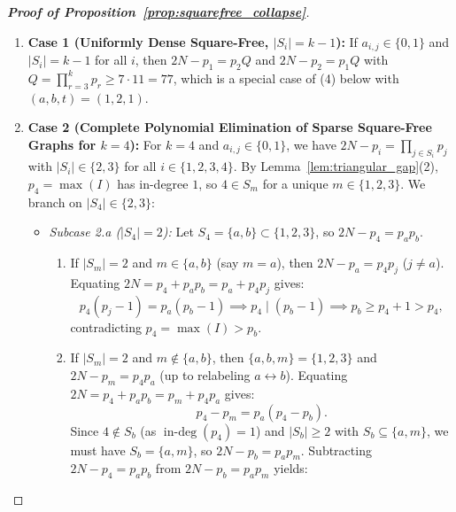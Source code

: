 \documentclass[11pt,a4paper]{article}
\theoremstyle{definition}
\begin{document}
\begin{proof}[\textbf{Proof of Proposition~\ref{prop:squarefree_collapse}}]
\begin{enumerate}
    \item \textbf{Case 1 (Uniformly Dense Square-Free, $|S_i| = k - 1$):}  
    If $a_{i,j} \in \{0, 1\}$ and $|S_i| = k - 1$ for all $i$, then $2N - p_1 = p_2 Q$ and $2N - p_2 = p_1 Q$ with $Q = \prod_{r=3}^k p_r \ge 7 \cdot 11 = 77$, which is a special case of (4) below with $(a, b, t) = (1, 2, 1)$.

    \item \textbf{Case 2 (Complete Polynomial Elimination of Sparse Square-Free Graphs for $k = 4$):}  
    For $k = 4$ and $a_{i,j} \in \{0, 1\}$, we have $2N - p_i = \prod_{j \in S_i} p_j$ with $|S_i| \in \{2, 3\}$ for all $i \in \{1, 2, 3, 4\}$. By Lemma~\ref{lem:triangular_gap}(2), $p_4 = \max(I)$ has in-degree $1$, so $4 \in S_m$ for a unique $m \in \{1, 2, 3\}$. We branch on $|S_4| \in \{2, 3\}$:
    \begin{itemize}
        \item \emph{Subcase 2.a ($|S_4| = 2$):} Let $S_4 = \{a, b\} \subset \{1, 2, 3\}$, so $2N - p_4 = p_a p_b$.
        \begin{enumerate}
            \item If $|S_m| = 2$ and $m \in \{a, b\}$ (say $m = a$), then $2N - p_a = p_4 p_j$ ($j \ne a$). Equating $2N = p_4 + p_a p_b = p_a + p_4 p_j$ gives:
            \begin{equation}
            \label{eq:k4_sqfree_subcase1}
            p_4(p_j - 1) = p_a(p_b - 1) \implies p_4 \mid (p_b - 1) \implies p_b \ge p_4 + 1 > p_4,
            \end{equation}
            contradicting $p_4 = \max(I) > p_b$.
            \item If $|S_m| = 2$ and $m \notin \{a, b\}$, then $\{a, b, m\} = \{1, 2, 3\}$ and $2N - p_m = p_4 p_a$ (up to relabeling $a \leftrightarrow b$). Equating $2N = p_4 + p_a p_b = p_m + p_4 p_a$ gives:
            \begin{equation}
            \label{eq:k4_sparse_diff1}
            p_4 - p_m = p_a(p_4 - p_b).
            \end{equation}
            Since $4 \notin S_b$ (as $\operatorname{in-deg}(p_4) = 1$) and $|S_b| \ge 2$ with $S_b \subseteq \{a, m\}$, we must have $S_b = \{a, m\}$, so $2N - p_b = p_a p_m$. Subtracting $2N - p_4 = p_a p_b$ from $2N - p_b = p_a p_m$ yields:
            \begin{equation}
            \label{eq:k4_sparse_diff2}

\end{equation}
\end{enumerate}
\end{itemize}
\end{enumerate}
\end{proof}
\end{document}
